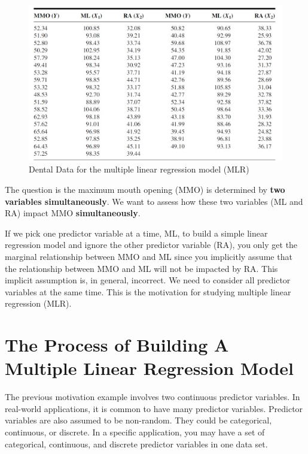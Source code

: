 \documentclass[
]{book}
\begin{document}
\begin{figure}

{\centering \includegraphics[width=0.8\linewidth]{img04/w04-DentalDataTable} 

}

\caption{Dental Data for the multiple linear regression model (MLR)}\label{fig:unnamed-chunk-75}
\end{figure}

The question is the maximum mouth opening (MMO) is determined by \textbf{two variables simultaneously}. We want to assess how these two variables (ML and RA) impact MMO \textbf{simultaneously}.

If we pick one predictor variable at a time, ML, to build a simple linear regression model and ignore the other predictor variable (RA), you only get the marginal relationship between MMO and ML since you implicitly assume that the relationship between MMO and ML will not be impacted by RA. This implicit assumption is, in general, incorrect. We need to consider all predictor variables at the same time. This is the motivation for studying multiple linear regression (MLR).

\hypertarget{the-process-of-building-a-multiple-linear-regression-model}{%
\section{The Process of Building A Multiple Linear Regression Model}\label{the-process-of-building-a-multiple-linear-regression-model}}

The previous motivation example involves two continuous predictor variables. In real-world applications, it is common to have many predictor variables. Predictor variables are also assumed to be non-random. They could be categorical, continuous, or discrete. In a specific application, you may have a set of categorical, continuous, and discrete predictor variables in one data set.
\end{document}
